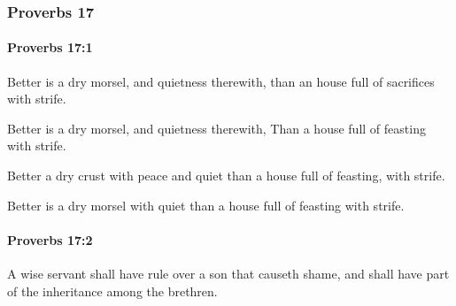 	\subsubsection{Proverbs 17} %
		\label{PROVERBS-17}

		\paragraph{Proverbs 17:1} %
			\label{PROVERBS-17-1}

			Better is a dry morsel, and quietness therewith, than an house full of sacrifices with strife.

			\begin{versebox}
					\item[BHS] 
					\item[ASV] Better is a dry morsel, and quietness therewith, Than a house full of feasting with strife.
					\item[NIV] Better a dry crust with peace and quiet than a house full of feasting, with strife.
					\item[NRSV] Better is a dry morsel with quiet than a house full of feasting with strife.
			\end{versebox}

		\paragraph{Proverbs 17:2} %
			\label{PROVERBS-17-2}

			A wise servant shall have rule over a son that causeth shame, and shall have part of the inheritance among the brethren.

